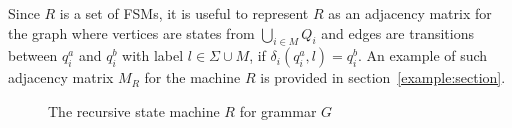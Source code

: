 
Since $R$ is a set of FSMs, it is useful to represent $R$ as an adjacency matrix for the graph where vertices are states from $\bigcup_{i \in M}Q_i$ and edges are transitions between $q_i^a$ and $q_i^b$ with label $l \in \Sigma \cup M$, if $\delta_i (q_i^a, l) = q_i^b$.
An example of such adjacency matrix $M_R$ for the machine $R$ is provided in section~\ref{example:section}.

\begin{figure}[h]
    \centering
    \caption{The recursive state machine $R$ for grammar $G$}
    \label{example:automata}
\end{figure}

